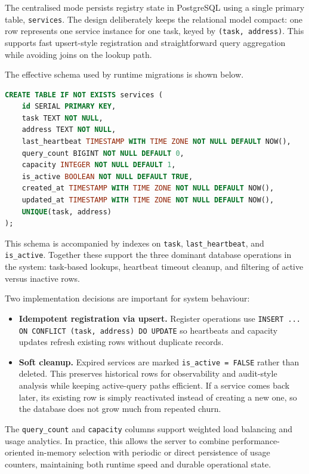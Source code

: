 \documentclass[10pt,a4paper]{article}
\begin{document}
The centralised mode persists registry state in PostgreSQL using a single primary table, \texttt{services}. The design deliberately keeps the relational model compact: one row represents one service instance for one task, keyed by \texttt{(task, address)}. This supports fast upsert-style registration and straightforward query aggregation while avoiding joins on the lookup path.

The effective schema used by runtime migrations is shown below.

\begin{lstlisting}[language=SQL]
CREATE TABLE IF NOT EXISTS services (
    id SERIAL PRIMARY KEY,
    task TEXT NOT NULL,
    address TEXT NOT NULL,
    last_heartbeat TIMESTAMP WITH TIME ZONE NOT NULL DEFAULT NOW(),
    query_count BIGINT NOT NULL DEFAULT 0,
    capacity INTEGER NOT NULL DEFAULT 1,
    is_active BOOLEAN NOT NULL DEFAULT TRUE,
    created_at TIMESTAMP WITH TIME ZONE NOT NULL DEFAULT NOW(),
    updated_at TIMESTAMP WITH TIME ZONE NOT NULL DEFAULT NOW(),
    UNIQUE(task, address)
);
\end{lstlisting}

This schema is accompanied by indexes on \texttt{task}, \texttt{last\_heartbeat}, and \texttt{is\_active}. Together these support the three dominant database operations in the system: task-based lookups, heartbeat timeout cleanup, and filtering of active versus inactive rows.

Two implementation decisions are important for system behaviour:
\begin{itemize}
    \item \textbf{Idempotent registration via upsert.} Register operations use \texttt{INSERT ... ON CONFLICT (task, address) DO UPDATE} so heartbeats and capacity updates refresh existing rows without duplicate records.
    \item \textbf{Soft cleanup.} Expired services are marked \texttt{is\_active = FALSE} rather than deleted. This preserves historical rows for observability and audit-style analysis while keeping active-query paths efficient. If a service comes back later, its existing row is simply reactivated instead of creating a new one, so the database does not grow much from repeated churn.
\end{itemize}

The \texttt{query\_count} and \texttt{capacity} columns support weighted load balancing and usage analytics. In practice, this allows the server to combine performance-oriented in-memory selection with periodic or direct persistence of usage counters, maintaining both runtime speed and durable operational state.
\end{document}
